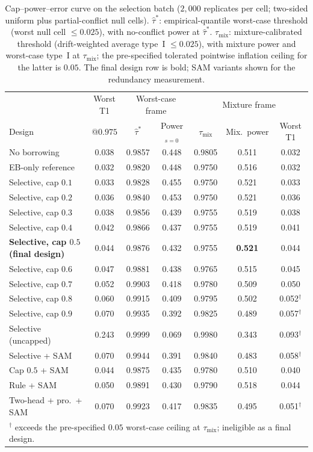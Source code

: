 \documentclass[11pt]{article}
\begin{document}
\begin{table}[htbp]
\centering
\small
\caption{Cap--power--error curve on the selection batch ($2{,}000$
replicates per cell; two-sided uniform plus partial-conflict null cells).
$\hat\tau^{*}$: empirical-quantile worst-case threshold (worst null cell
$\le 0.025$), with no-conflict power at $\hat\tau^{*}$.
$\tau_{\mathrm{mix}}$: mixture-calibrated
threshold (drift-weighted average type~I $\le 0.025$), with mixture power
and worst-case type~I at $\tau_{\mathrm{mix}}$; the pre-specified tolerated
pointwise inflation ceiling
for the latter is $0.05$. The final design row is bold; SAM variants shown
for the redundancy measurement.}
\label{tab:capcurve}
\begin{tabular}{lcccccc}
\hline
 & Worst T1 & \multicolumn{2}{c}{Worst-case frame} &
\multicolumn{3}{c}{Mixture frame} \\
Design & @$0.975$ & $\hat\tau^{*}$ & Power$_{s=0}$ & $\tau_{\mathrm{mix}}$ &
Mix.\ power & Worst T1 \\
\hline
No borrowing         & 0.038 & 0.9857 & 0.448 & 0.9805 & 0.511 & 0.032 \\
EB-only reference    & 0.032 & 0.9820 & 0.448 & 0.9750 & 0.516 & 0.032 \\
Selective, cap $0.1$ & 0.033 & 0.9828 & 0.455 & 0.9750 & 0.521 & 0.033 \\
Selective, cap $0.2$ & 0.036 & 0.9840 & 0.453 & 0.9750 & 0.521 & 0.036 \\
Selective, cap $0.3$ & 0.038 & 0.9856 & 0.439 & 0.9755 & 0.519 & 0.038 \\
Selective, cap $0.4$ & 0.042 & 0.9866 & 0.437 & 0.9755 & 0.519 & 0.041 \\
\textbf{Selective, cap $0.5$ (final design)}
                     & 0.044 & 0.9876 & 0.432 & 0.9755 & \textbf{0.521} & 0.044 \\
Selective, cap $0.6$ & 0.047 & 0.9881 & 0.438 & 0.9765 & 0.515 & 0.045 \\
Selective, cap $0.7$ & 0.052 & 0.9903 & 0.418 & 0.9780 & 0.509 & 0.050 \\
Selective, cap $0.8$ & 0.060 & 0.9915 & 0.409 & 0.9795 & 0.502 & 0.052$^{\dagger}$ \\
Selective, cap $0.9$ & 0.070 & 0.9935 & 0.392 & 0.9825 & 0.489 & 0.057$^{\dagger}$ \\
Selective (uncapped) & 0.243 & 0.9999 & 0.069 & 0.9980 & 0.343 & 0.093$^{\dagger}$ \\
Selective + SAM      & 0.070 & 0.9944 & 0.391 & 0.9840 & 0.483 & 0.058$^{\dagger}$ \\
Cap $0.5$ + SAM      & 0.044 & 0.9875 & 0.435 & 0.9780 & 0.510 & 0.040 \\
Rule + SAM           & 0.050 & 0.9891 & 0.430 & 0.9790 & 0.518 & 0.044 \\
Two-head + pro.\ + SAM & 0.070 & 0.9923 & 0.417 & 0.9835 & 0.495 & 0.051$^{\dagger}$ \\
\hline
\multicolumn{7}{l}{\footnotesize $^{\dagger}$ exceeds the pre-specified
$0.05$ worst-case ceiling at $\tau_{\mathrm{mix}}$; ineligible as a final
design.}\\
\end{tabular}
\end{table}
\end{document}
